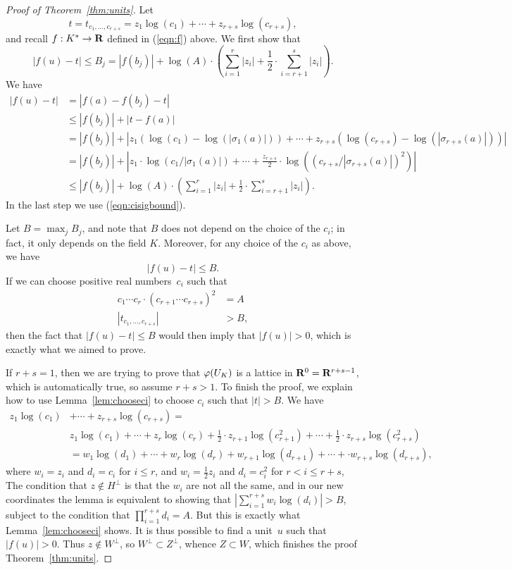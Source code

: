 \begin{proof}[Proof of Theorem~\ref{thm:units}]
Let 
$$
t = t_{c_1,\ldots, c_{r+s}} = z_1\log(c_1)+\cdots +z_{r+s}\log(c_{r+s}),
$$ 
and recall $f:K^*\to \mathbf{R}$ defined in
(\ref{eqn:f}) above.  We first show that
$$
  |f(u) - t| \leq B_j = 
 |f(b_j)| + \log(A)\cdot\left(\sum_{i=1}^{r}|z_i| + 
         \frac{1}{2}\cdot \sum_{i=r+1}^s|z_i|\right).
$$
We have
\begin{align*}
  |f(u) - t| &= |f(a) - f(b_j) - t|\\
   &\leq |f(b_j)| + |t - f(a)|\\
   &=|f(b_j)| + |z_1(\log(c_1) - \log(|\sigma_1(a)|)) + \cdots + z_{r+s}(\log(c_{r+s}) - \log(|\sigma_{r+s}(a)|))|\\
   &=|f(b_j)| + |z_1\cdot \log(c_1/|\sigma_1(a)|) + \cdots + \frac{z_{r+s}}{2}\cdot \log((c_{r+s}/|\sigma_{r+s}(a)|)^2)|\\
   &\leq |f(b_j)| + \log(A)\cdot\left(\sum_{i=1}^{r}|z_i| + \frac{1}{2}\cdot \sum_{i=r+1}^s|z_i|\right).
\end{align*}
In the last step we use 
(\ref{eqn:cisigbound}).

Let $B=\max_{j} B_j$, and note that $B$ does not depend on the choice
of the $c_i$; in fact, it only depends on the field $K$.
Moreover, for any choice of the $c_i$ as above, we have
$$
  |f(u) - t| \leq B.
$$
If we can choose positive real numbers~$c_i$ such that
\begin{align*}
 c_1\cdots c_r\cdot (c_{r+1}\cdots c_{r+s})^2 &= A\\
  |t_{c_1,\ldots, c_{r+s}}| &>B,
\end{align*}
then the fact that $|f(u)-t|\leq B$ would then imply that $|f(u)|>0$,
which is exactly what we aimed to prove.

If $r+s=1$, then we are trying to prove that $\varphi(U_K)$ is a lattice
in $\mathbf{R}^0=\mathbf{R}^{r+s-1}$, which is automatically true, so assume $r+s>1$.
To finish the proof, we explain how to use Lemma~\ref{lem:chooseci}
to choose $c_i$ such that $|t|>B$.  We have
\begin{align*}
z_1\log(c_1)&+\cdots +z_{r+s}\log(c_{r+s})
 =\\ 
&z_1\log(c_1)+\cdots +  z_r\log(c_r)+
\frac{1}{2}\cdot z_{r+1}\log(c_{r+1}^2) + 
\cdots + \frac{1}{2}\cdot z_{r+s}\log(c_{r+s}^2)\\
&=w_1\log(d_1)+\cdots +  w_r\log(d_r)+
w_{r+1}\log(d_{r+1}) + 
\cdots +\cdot w_{r+s}\log(d_{r+s}),
\end{align*}
where $w_i=z_i$ and $d_i=c_i$ for $i\leq r$, and
$w_i=\frac{1}{2}z_i$ and $d_i=c_i^2$ for $r<i\leq r+s$,
The condition that $z\not\in H^{\perp}$ is that the $w_i$ are not all
the same, 
 and in our new coordinates the lemma is equivalent to
showing that $|\sum_{i=1}^{r+s} w_i \log(d_i)|>B$, subject to the
condition that $\prod_{i=1}^{r+s} d_i = A$. 
But this is exactly what Lemma~\ref{lem:chooseci} shows.
It is thus possible
to find a unit~$u$ such that $|f(u)|>0$.  Thus $z\not\in
W^{\perp}$, so $W^{\perp}\subset Z^{\perp}$, whence $Z\subset W$,
which finishes the proof Theorem~\ref{thm:units}.
\end{proof}


